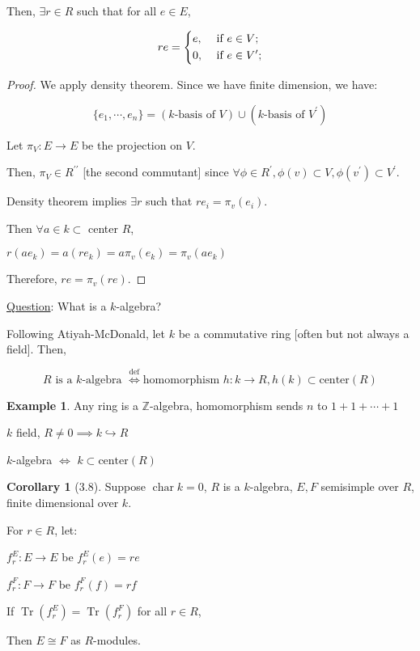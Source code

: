 \documentclass{article}
\theoremstyle{definition}
\newtheorem*{example}{Example}
\newtheorem{corollary}[theorem]{Corollary}
\newcommand{\Char}{\operatorname{char}}
\newcommand{\Tr}{\operatorname{Tr}}
\begin{document}
Then, \(\exists r\in R\) such that for all \(e \in E\),

\[
    r e = \begin{dcases}
        e, &\text{ if } e \in V ;\\
        0, &\text{ if } e\in V^{\prime}  ;
    \end{dcases}
\]

\begin{proof}
    We apply density theorem. Since we have finite dimension, we have:

    \[
        \{ e_1, \cdots , e_n \} = (k\text{-basis of } V) \cup (k\text{-basis of } V^{\prime})
    \]

    Let \(\pi_V : E \to E\) be the projection on \(V\).

    Then, \(\pi_V \in R^{\prime\prime}\) [the second commutant] since \(\forall \phi \in R^{\prime}, \phi (v) \subset V, \phi(v^{\prime}) \subset V^{\prime}\).

    Density theorem implies \(\exists r\) such that \(r e_i = \pi_v(e_i)\).

    Then \(\forall a\in k \subset \) center \(R\),

    \(r (a e_k) = a (r e_k) = a \pi_v (e_k) = \pi_v (a e_k)\) 

    Therefore, \(r e = \pi _v(re)\).
\end{proof}

\underline{Question}: What is a \(k\)-algebra?

Following Atiyah-McDonald, let \(k\) be a commutative ring [often but not always a field]. Then,

\[
    R \text{ is a } k \text{-algebra } \overset{\text{def}}{\iff} \text{homomorphism } h: k \to R, h(k) \subset \text{center}(R)
\]

\begin{example}
    Any ring is a \(\mathbb{Z}\)-algebra, homomorphism sends \(n\) to \(1+1+\cdots+1\) 

    \(k\) field, \(R \neq 0 \implies k \hookrightarrow R\)
    
    \(k\)-algebra \(\iff\) \(k \subset \text{center}(R)\) 
\end{example}

\begin{corollary}
    [3.8]

    Suppose \(\Char k = 0\), \(R\) is a \(k\)-algebra, \(E,F\) semisimple over \(R\), finite dimensional over \(k\).
    
    For \(r\in R\), let:

    \(f_r^E : E \to E\) be \(f_r^E(e)=re\) 

    \(f_r^F : F \to F\) be \(f_r^F(f)=rf\) 

    If \(\Tr(f_r^E)=\Tr(f_r^F)\) for all \(r\in R\),
    
    Then \(E \cong F\) as \(R\)-modules.
\end{corollary}
\end{document}
